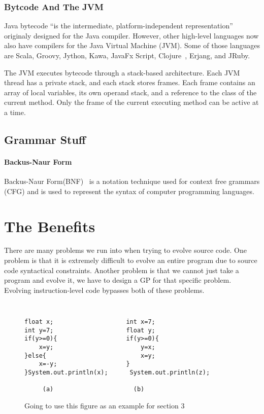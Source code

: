 \documentclass{sig-alternate}
\begin{document}
\subsubsection{ Bytcode And The JVM}
Java bytecode ``is the intermediate, platform-independent representation''~\cite{VIII:2011} originaly designed for the Java compiler. However, other high-level languages now also have compilers for the Java Virtual Machine (JVM). Some of those languages are Scala, Groovy, Jython, Kawa, JavaFx Script, Clojure~\cite{FINCH:2011}, Erjang, and JRuby. 

The JVM executes bytecode through a stack-based architecture. Each JVM thread has a private stack, and each stack stores frames. Each frame contains an array of local variables, its own operand stack, and a reference to the class of the current method. Only the frame of the current executing method can be active at a time.


\subsection{Grammar Stuff}

\paragraph{Backus-Naur Form}
	Backus-Naur Form(BNF)~\cite{BNF:2014} is a notation technique used for context free grammars (CFG) and is used to represent the syntax of computer programming languages.



\section{The Benefits}

There are many problems we run into when trying to evolve source code. One problem is that it is extremely difficult to evolve an entire program due to source code syntactical constraints. Another problem is that we cannot just take a program and evolve it, we have to design  a GP for that specific problem. Evolving instruction-level code bypasses both of these problems.

\begin{figure}
\centering
{\tt
\begin{verbatim}
float x;                    int x=7;
int y=7;                    float y;
if(y>=0){                   if(y>=0){
    x=y;                        y=x;
}else{                          x=y;
    x=-y;                   }
}System.out.println(x);      System.out.println(z);	
     
     (a)                      (b)

\end{verbatim}
}
\caption{Going to use this figure as an example for section 3}
\end{figure}
\end{document}
